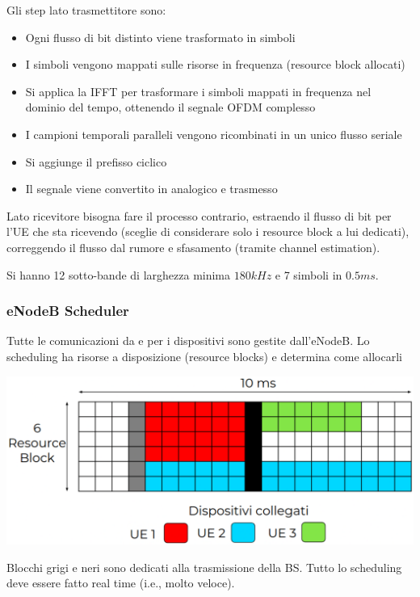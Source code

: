 Gli step lato trasmettitore sono: 
\begin{itemize}
	\item Ogni flusso di bit distinto viene trasformato in simboli

	\item I simboli vengono mappati sulle risorse in frequenza (resource block allocati)

	\item Si applica la IFFT per trasformare i simboli mappati in frequenza nel dominio del tempo, ottenendo il segnale OFDM complesso

	\item I campioni temporali paralleli vengono ricombinati in un unico flusso seriale

	\item Si aggiunge il prefisso ciclico

	\item Il segnale viene convertito in analogico e trasmesso
\end{itemize}

Lato ricevitore bisogna fare il processo contrario, estraendo il flusso di bit per l'UE che sta ricevendo (sceglie di considerare solo i resource block a lui dedicati), correggendo il flusso dal rumore e sfasamento (tramite channel estimation).

Si hanno 12 sotto-bande di larghezza minima $180 kHz$ e 7 simboli in $0.5ms$. 

\subsubsection{eNodeB Scheduler}

Tutte le comunicazioni da e per i dispositivi sono gestite dall'eNodeB. Lo scheduling ha risorse a disposizione (resource blocks) e determina come allocarli
\begin{center}
	\includegraphics[width=0.75\linewidth]{img/4g/alloc}
\end{center}

Blocchi grigi e neri sono dedicati alla trasmissione della BS. Tutto lo scheduling deve essere fatto real time (i.e., molto veloce).

